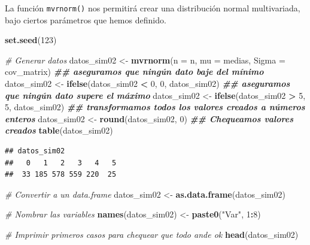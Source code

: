 \documentclass[
]{book}
\newenvironment{Shaded}{\begin{snugshade}}{\end{snugshade}}
\newcommand{\AttributeTok}[1]{\textcolor[rgb]{0.13,0.29,0.53}{#1}}
\newcommand{\CommentTok}[1]{\textcolor[rgb]{0.56,0.35,0.01}{\textit{#1}}}
\newcommand{\DecValTok}[1]{\textcolor[rgb]{0.00,0.00,0.81}{#1}}
\newcommand{\DocumentationTok}[1]{\textcolor[rgb]{0.56,0.35,0.01}{\textbf{\textit{#1}}}}
\newcommand{\FunctionTok}[1]{\textcolor[rgb]{0.13,0.29,0.53}{\textbf{#1}}}
\newcommand{\NormalTok}[1]{#1}
\newcommand{\OtherTok}[1]{\textcolor[rgb]{0.56,0.35,0.01}{#1}}
\newcommand{\SpecialCharTok}[1]{\textcolor[rgb]{0.81,0.36,0.00}{\textbf{#1}}}
\newcommand{\StringTok}[1]{\textcolor[rgb]{0.31,0.60,0.02}{#1}}
\begin{document}
La función \texttt{mvrnorm()} nos permitirá crear una distribución normal multivariada, bajo ciertos parámetros que hemos definido.

\begin{Shaded}
\begin{Highlighting}[]
\FunctionTok{set.seed}\NormalTok{(}\DecValTok{123}\NormalTok{)}

\CommentTok{\# Generar datos}
\NormalTok{datos\_sim02 }\OtherTok{\textless{}{-}} \FunctionTok{mvrnorm}\NormalTok{(}\AttributeTok{n =}\NormalTok{ n, }\AttributeTok{mu =}\NormalTok{ medias, }\AttributeTok{Sigma =}\NormalTok{ cov\_matrix)}
\DocumentationTok{\#\# aseguramos que ningún dato baje del mínimo}
\NormalTok{datos\_sim02 }\OtherTok{\textless{}{-}} \FunctionTok{ifelse}\NormalTok{(datos\_sim02 }\SpecialCharTok{\textless{}} \DecValTok{0}\NormalTok{, }\DecValTok{0}\NormalTok{, datos\_sim02)}
\DocumentationTok{\#\# aseguramos que ningún dato supere el máximo}
\NormalTok{datos\_sim02 }\OtherTok{\textless{}{-}} \FunctionTok{ifelse}\NormalTok{(datos\_sim02 }\SpecialCharTok{\textgreater{}} \DecValTok{5}\NormalTok{, }\DecValTok{5}\NormalTok{, datos\_sim02)}
\DocumentationTok{\#\# transformamos todos los valores creados a números enteros}
\NormalTok{datos\_sim02 }\OtherTok{\textless{}{-}} \FunctionTok{round}\NormalTok{(datos\_sim02, }\DecValTok{0}\NormalTok{)}
\DocumentationTok{\#\# Chequeamos valores creados}
\FunctionTok{table}\NormalTok{(datos\_sim02)}
\end{Highlighting}
\end{Shaded}

\begin{verbatim}
## datos_sim02
##   0   1   2   3   4   5 
##  33 185 578 559 220  25
\end{verbatim}

\begin{Shaded}
\begin{Highlighting}[]
\CommentTok{\# Convertir a un data.frame}
\NormalTok{datos\_sim02 }\OtherTok{\textless{}{-}} \FunctionTok{as.data.frame}\NormalTok{(datos\_sim02)}

\CommentTok{\# Nombrar las variables}
\FunctionTok{names}\NormalTok{(datos\_sim02) }\OtherTok{\textless{}{-}} \FunctionTok{paste0}\NormalTok{(}\StringTok{"Var"}\NormalTok{, }\DecValTok{1}\SpecialCharTok{:}\DecValTok{8}\NormalTok{)}

\CommentTok{\# Imprimir primeros casos para chequear que todo ande ok}
\FunctionTok{head}\NormalTok{(datos\_sim02)}
\end{Highlighting}
\end{Shaded}
\end{document}
